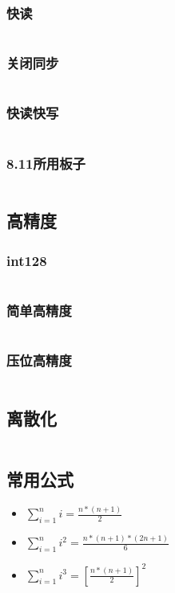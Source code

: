 \documentclass[a4paper,11pt]{article}
\begin{document}
\subsubsection{快读}
\inputminted[breaklines,linenos,frame=leftline]{c++}{others/read1.cpp}
\subsubsection{关闭同步}
\inputminted[breaklines,linenos,frame=leftline]{c++}{others/read2.cpp}
\subsubsection{快读快写}
\inputminted[breaklines,linenos,frame=leftline]{c++}{others/read3.cpp}
\subsubsection{8.11所用板子}
\inputminted[breaklines,linenos,frame=leftline]{c++}{others/7.19.cpp}

\subsection{高精度}
\subsubsection{int128}
\inputminted[breaklines,linenos,frame=leftline]{c++}{others/int128.cpp}
\subsubsection{简单高精度}
\inputminted[breaklines,linenos,frame=leftline]{c++}{others/bignum2.cpp}
\subsubsection{压位高精度}
\inputminted[breaklines,linenos,frame=leftline]{c++}{others/bignum1.cpp}

\subsection{离散化}
\inputminted[breaklines,linenos,frame=leftline]{c++}{others/discretize.cpp}

\subsection{常用公式}
\begin{itemize}
    \item $\sum_{i=1}^{n} i = \frac{n*(n+1)}{2} $
    \item $\sum_{i=1}^{n} i^2 = \frac{n*(n+1)*(2n+1)}{6} $
    \item $\sum_{i=1}^{n} i^3 = \left[\frac{n*(n+1)}{2}\right]^2 $
\end{itemize}
\end{document}
